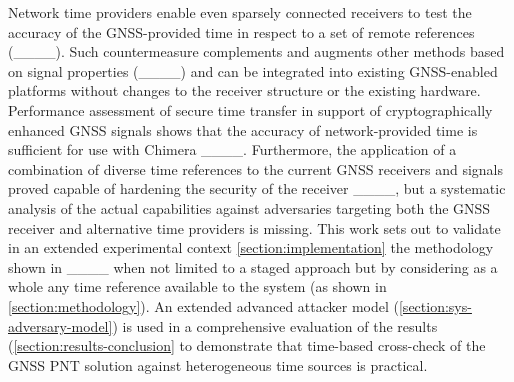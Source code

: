 Network time providers enable even sparsely connected receivers to test the accuracy of the GNSS-provided time in respect to a set of remote references (____). Such countermeasure complements and augments other methods based on signal properties (____) and can be integrated into existing GNSS-enabled platforms without changes to the receiver structure or the existing hardware.  Performance assessment of secure time transfer in support of cryptographically enhanced GNSS signals shows that the accuracy of network-provided time is sufficient for use with Chimera ____. Furthermore, the application of a combination of diverse time references to the current GNSS receivers and signals proved capable of hardening the security of the receiver ____, but a systematic analysis of the actual capabilities against adversaries targeting both the GNSS receiver and alternative time providers is missing. This work sets out to validate in an extended experimental context \cref{section:implementation} the methodology shown in ____ when not limited to a staged approach but by considering as a whole any time reference available to the system (as shown in \cref{section:methodology}). An extended advanced attacker model (\cref{section:sys-adversary-model}) is used in a comprehensive evaluation of the results (\cref{section:results-conclusion} to demonstrate that time-based cross-check of the GNSS PNT solution against heterogeneous time sources is practical.


